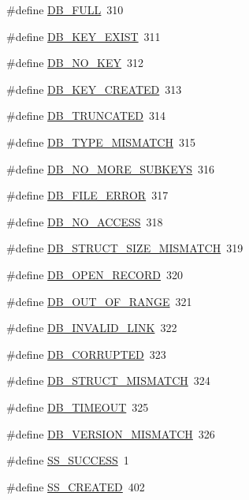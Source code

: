 \begin{DoxyCompactItemize}
\item 
\#define \hyperlink{group__err23_ga25a395a210f89c1a6cfa6efd724657c0}{DB\_\-FULL}~310
\item 
\#define \hyperlink{group__err23_ga2989be8053dffcaf9f4e60ce677e98d3}{DB\_\-KEY\_\-EXIST}~311
\item 
\#define \hyperlink{group__err23_ga8c6c8ed2099cf2468f0c7c6cd475fe7e}{DB\_\-NO\_\-KEY}~312
\item 
\#define \hyperlink{group__err23_ga2d57548d0380a9cd53ba2cc16184705f}{DB\_\-KEY\_\-CREATED}~313
\item 
\#define \hyperlink{group__err23_gaf7d81a3217ef14ed73f3089f51584bd9}{DB\_\-TRUNCATED}~314
\item 
\#define \hyperlink{group__err23_gab284e13875988d7c16d30c8fe7597f5a}{DB\_\-TYPE\_\-MISMATCH}~315
\item 
\#define \hyperlink{group__err23_gaf2249d36fd8ffb254cd33a3bbc899638}{DB\_\-NO\_\-MORE\_\-SUBKEYS}~316
\item 
\#define \hyperlink{group__err23_ga39b1479e417376866f2658812ae4ba6b}{DB\_\-FILE\_\-ERROR}~317
\item 
\#define \hyperlink{group__err23_ga467b0af34b1011481919088b6af86b95}{DB\_\-NO\_\-ACCESS}~318
\item 
\#define \hyperlink{group__err23_ga920c5c179829999cc9b35cec855c7aec}{DB\_\-STRUCT\_\-SIZE\_\-MISMATCH}~319
\item 
\#define \hyperlink{group__err23_gacfc6bca00bde3af90d259cb4ae98deb0}{DB\_\-OPEN\_\-RECORD}~320
\item 
\#define \hyperlink{group__err23_ga1043c6971ce0fc8cc5613ec81e315789}{DB\_\-OUT\_\-OF\_\-RANGE}~321
\item 
\#define \hyperlink{group__err23_gac76d78c0ecc26f907b9996eb5ad1d86b}{DB\_\-INVALID\_\-LINK}~322
\item 
\#define \hyperlink{group__err23_gaa127076644c7cc5c76fa9e1354ea6574}{DB\_\-CORRUPTED}~323
\item 
\#define \hyperlink{group__err23_ga0ee271607cfbec2e6050b0ea6e5ef533}{DB\_\-STRUCT\_\-MISMATCH}~324
\item 
\#define \hyperlink{group__err23_gac3c60a757927f22fc91643550d780a85}{DB\_\-TIMEOUT}~325
\item 
\#define \hyperlink{group__err23_gaf466ab5a9f2f1febef5fb3e4c12df14b}{DB\_\-VERSION\_\-MISMATCH}~326
\item 
\#define \hyperlink{group__err24_ga0abac6c68d7a79ce83d1a25b2c800321}{SS\_\-SUCCESS}~1
\item 
\#define \hyperlink{group__err24_ga7440cf35b00082fb16e8584ada5b50e0}{SS\_\-CREATED}~402

\end{DoxyCompactItemize}
